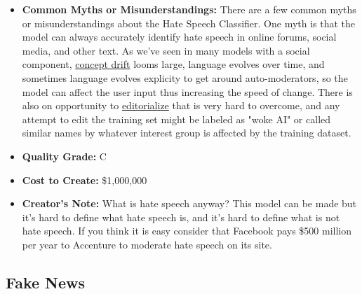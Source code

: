 \begin{itemize}
    \item \textbf{Common Myths or Misunderstandings:} There are a few common myths or misunderstandings about the Hate Speech Classifier. One myth is that the model can always accurately identify hate speech in online forums, social media, and other text. As we've seen in many models with a social component, \hyperref[sec:drift]{concept drift} looms large, language evolves over time, and sometimes language evolves explicity to get around auto-moderators, so the model can affect the user input thus increasing the speed of change. There is also on opportunity to \hyperref[sec:janitor]{editorialize} that is very hard to overcome, and any attempt to edit the training set might be labeled as "woke AI" or called similar names by whatever interest group is affected by the training dataset.  
    \item \textbf{Quality Grade:} C
    \item \textbf{Cost to Create:} \$1,000,000
    \item \textbf{Creator's Note:} What is hate speech anyway? This model can be made but it's hard to define what hate speech is, and it's hard to define what is not hate speech. If you think it is easy consider that Facebook pays \$500 million per year to Accenture to moderate hate speech on its site.
\end{itemize}

\subsection{Fake News}


